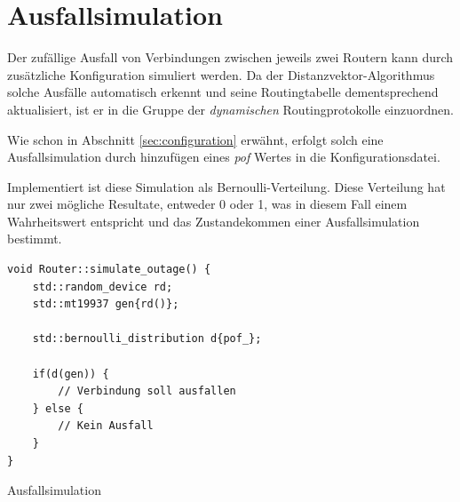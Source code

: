 \documentclass[a4paper,ngerman]{article}
\begin{document}
\section{Ausfallsimulation}


Der zufällige Ausfall von Verbindungen zwischen jeweils zwei Routern kann durch zusätzliche Konfiguration simuliert werden. Da der Distanzvektor-Algorithmus solche Ausfälle automatisch erkennt und seine Routingtabelle dementsprechend aktualisiert, ist er in die Gruppe der \textit{dynamischen} Routingprotokolle einzuordnen.

Wie schon in Abschnitt \vref{sec:configuration} erwähnt, erfolgt solch eine Ausfallsimulation durch hinzufügen eines \textit{pof} Wertes in die Konfigurationsdatei.

Implementiert ist diese Simulation als Bernoulli-Verteilung. Diese Verteilung hat nur zwei mögliche Resultate, entweder 0 oder 1, was in diesem Fall einem Wahrheitswert entspricht und das Zustandekommen einer Ausfallsimulation bestimmt.

\begin{listing}[H]
\centering
\begin{minipage}{0.5\textwidth}
\begin{verbatim}
void Router::simulate_outage() {
    std::random_device rd;
    std::mt19937 gen{rd()};

    std::bernoulli_distribution d{pof_};

    if(d(gen)) {
        // Verbindung soll ausfallen
    } else {
        // Kein Ausfall
    }
}
\end{verbatim}
\end{minipage}
\label{code:simulate_outage}
\caption{Ausfallsimulation}
\end{listing}
\end{document}
